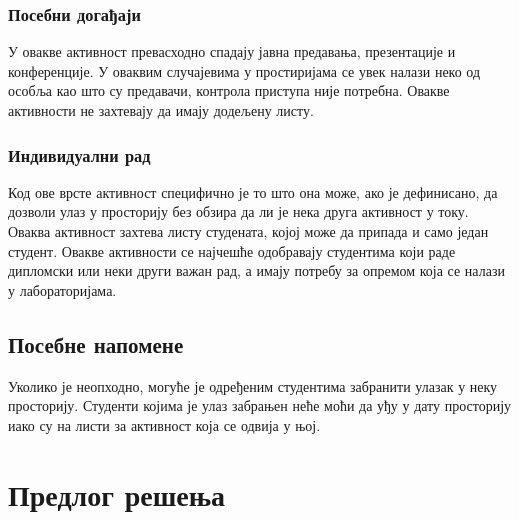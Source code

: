 \documentclass[a4paper, 12pt, diplomski]{etfcyr}
\begin{document}
			\newpage

			\subsection[Сценарио 4]{Посебни догађаји}
				\begin{justify}
					У овакве активност превасходно спадају јавна предавања, презентације и конференције. У оваквим случајевима у простиријама се увек налази неко од особља као што су предавачи, контрола приступа није потребна. Овакве активности не захтевају да имају додељену листу.
				\end{justify}

			\subsection[Сценарио 5]{Индивидуални рад}
				\begin{justify}
					Код ове врсте активност специфично је то што она може, ако је дефинисано, да дозволи улаз у просторију без обзира да ли је нека друга активност у току. Оваква активност захтева листу студената, којој може да припада и само један студент. Овакве активности се најчешће одобравају студентима који раде дипломски или неки други важан рад, а имају потребу за опремом која се налази у лабораторијама.
				\end{justify}

		\section{Посебне напомене}
			\begin{justify}
				Уколико је неопходно, могуће је одређеним студентима забранити улазак у неку просторију. Студенти којима је улаз забрањен неће моћи да уђу у дату просторију иако су на листи за активност која се одвија у њој.
			\end{justify}

	\chapter{Предлог решења}
\end{document}
